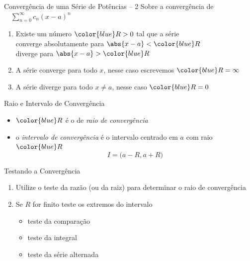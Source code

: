 \begin{frame}{Convergência de uma Série de Potências -- 2}
  Sobre a convergência de
  \(\quad\sum_{n=0}^\infty c_n(x-a)^n\quad\)

  \pause
  \vspace{\baselineskip}
  \begin{enumerate}[<+->]
    \item Existe um número ${\color{blue}R>0}$ tal que a série \\[1mm]
          \tabto{10mm} converge absolutamente para \tabto{70mm} \(\abs{x-a}<{\color{blue}R}\) \\
          \tabto{10mm} diverge para                \tabto{70mm} \(\abs{x-a}>{\color{blue}R}\)
    \vspace{\baselineskip}
    \item A série converge para todo $x$, nesse caso escrevemos ${\color{blue}R=\infty}$
    \vspace{\baselineskip}
    \item A série diverge para todo $x\neq a$, nesse caso ${\color{blue}R=0}$
  \end{enumerate}
\end{frame}

\begin{frame}{Raio e Intervalo de Convergência}
  \begin{itemize}[<+->]
    \item \({\color{blue}R}\) é o de \emph{raio de convergência} \\[\baselineskip]
    \item o \emph{intervalo de convergência} é o intervalo centrado em \(a\) com raio ${\color{blue}R}$
          \[
            I = \big( a-R, a+R \big)
          \]
  \end{itemize}

\end{frame}

\begin{frame}{Testando a Convergência}
  \begin{enumerate}[<+->]
  \item Utilize o teste da razão (ou da raiz) para determinar o raio de convergência
  \vspace{\baselineskip}
  \item Se \(R\) for finito teste os extremos do intervalo
        \begin{itemize}
          \item teste da comparação
          \item teste da integral
          \item teste da série alternada
        \end{itemize}
  \end{enumerate}
\end{frame}


